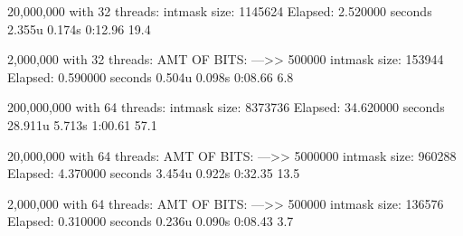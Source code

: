 \documentclass[letterpaper,10pt,titlepage]{article}
\begin{document}
20,000,000 with 32 threads:
intmask size:  1145624
Elapsed: 2.520000 seconds
2.355u 0.174s 0:12.96 19.4%

2,000,000 with 32 threads:
AMT OF BITS:  --->> 500000
intmask size:  153944
Elapsed: 0.590000 seconds
0.504u 0.098s 0:08.66 6.8%





200,000,000 with 64 threads:
intmask size:  8373736
Elapsed: 34.620000 seconds
28.911u 5.713s 1:00.61 57.1%

20,000,000 with 64 threads:
AMT OF BITS:  --->> 5000000
intmask size:  960288
Elapsed: 4.370000 seconds
3.454u 0.922s 0:32.35 13.5%

2,000,000 with 64 threads:
 AMT OF BITS:  --->> 500000
intmask size:  136576
Elapsed: 0.310000 seconds
0.236u 0.090s 0:08.43 3.7%
\end{document}
